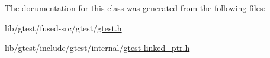 The documentation for this class was generated from the following files\-:\begin{DoxyCompactItemize}
\item 
lib/gtest/fused-\/src/gtest/\hyperlink{fused-src_2gtest_2gtest_8h}{gtest.\-h}\item 
lib/gtest/include/gtest/internal/\hyperlink{gtest-linked__ptr_8h}{gtest-\/linked\-\_\-ptr.\-h}\end{DoxyCompactItemize}
